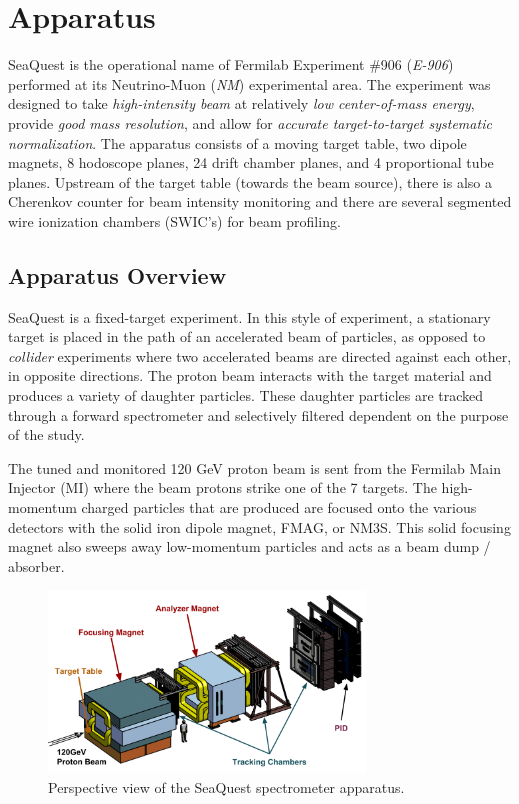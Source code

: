 \chapter{Apparatus}

SeaQuest is the operational name of Fermilab Experiment \#906 (\emph{E-906}) performed at its Neutrino-Muon (\emph{NM})
experimental area. The experiment was designed
to take \emph{high-intensity beam} at relatively \emph{low center-of-mass energy}, provide
\emph{good mass resolution}, and allow for \emph{accurate target-to-target systematic normalization}.
The apparatus consists of a moving target table, two dipole magnets, 8 hodoscope planes, 24 drift 
chamber planes, and 4 proportional tube planes. Upstream of the target table (towards the beam source),
there is also a Cherenkov counter for beam intensity monitoring and there are
several segmented wire ionization chambers (SWIC's) for beam profiling.

\section{Apparatus Overview}

SeaQuest is a fixed-target experiment. In this style of
experiment, a stationary target is placed in the path of an accelerated beam of particles, as opposed to \emph{collider} 
experiments where two accelerated beams are directed against each other, in opposite directions. The proton beam
interacts with the target material and produces a variety of daughter particles. These daughter particles are 
tracked through a forward spectrometer and selectively filtered dependent on the purpose of the study.

The tuned and monitored 120 GeV proton beam is sent from the Fermilab Main Injector (MI) where the beam
protons strike one of the 7 targets. The high-momentum charged particles that are produced are focused
onto the various detectors with the solid iron dipole magnet, FMAG, or NM3S. 
This solid focusing magnet also sweeps away low-momentum particles and acts as a beam dump / absorber.

\begin{figure}
	\begin{center}
		\includegraphics[width=0.75\textwidth]{figures/Spectrometer.png}
		\caption{Perspective view of the SeaQuest spectrometer apparatus.}
		\label{fig:spectrometer-perspective}
	\end{center}
\end{figure}



